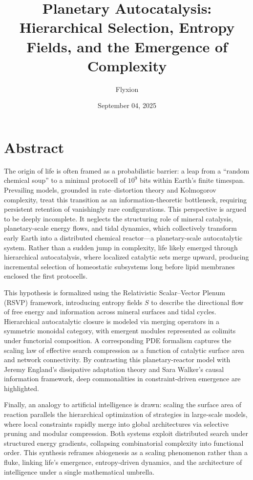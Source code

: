 \documentclass{book}
\title{Planetary Autocatalysis: Hierarchical Selection, Entropy Fields, and the Emergence of Complexity}
\author{Flyxion}
\date{September 04, 2025}
\begin{document}
\maketitle

\tableofcontents

\section*{Abstract}
The origin of life is often framed as a probabilistic barrier: a leap from a “random chemical soup” to a minimal protocell of $10^9$ bits within Earth’s finite timespan. Prevailing models, grounded in rate–distortion theory and Kolmogorov complexity, treat this transition as an information-theoretic bottleneck, requiring persistent retention of vanishingly rare configurations. This perspective is argued to be deeply incomplete. It neglects the structuring role of mineral catalysis, planetary-scale energy flows, and tidal dynamics, which collectively transform early Earth into a distributed chemical reactor—a planetary-scale autocatalytic system. Rather than a sudden jump in complexity, life likely emerged through hierarchical autocatalysis, where localized catalytic sets merge upward, producing incremental selection of homeostatic subsystems long before lipid membranes enclosed the first protocells.

This hypothesis is formalized using the Relativistic Scalar–Vector Plenum (RSVP) framework, introducing entropy fields $S$ to describe the directional flow of free energy and information across mineral surfaces and tidal cycles. Hierarchical autocatalytic closure is modeled via merging operators in a symmetric monoidal category, with emergent modules represented as colimits under functorial composition. A corresponding PDE formalism captures the scaling law of effective search compression as a function of catalytic surface area and network connectivity. By contrasting this planetary-reactor model with Jeremy England’s dissipative adaptation theory and Sara Walker’s causal information framework, deep commonalities in constraint-driven emergence are highlighted.

Finally, an analogy to artificial intelligence is drawn: scaling the surface area of reaction parallels the hierarchical optimization of strategies in large-scale models, where local constraints rapidly merge into global architectures via selective pruning and modular compression. Both systems exploit distributed search under structured energy gradients, collapsing combinatorial complexity into functional order. This synthesis reframes abiogenesis as a scaling phenomenon rather than a fluke, linking life’s emergence, entropy-driven dynamics, and the architecture of intelligence under a single mathematical umbrella.
\end{document}
